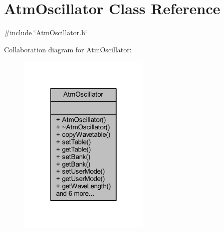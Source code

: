 \hypertarget{class_atm_oscillator}{}\section{Atm\+Oscillator Class Reference}
\label{class_atm_oscillator}


{\ttfamily \#include \char`\"{}Atm\+Oscillator.\+h\char`\"{}}



Collaboration diagram for Atm\+Oscillator\+:
\nopagebreak
\begin{figure}[H]
\begin{center}
\leavevmode
\includegraphics[width=178pt]{da/daa/class_atm_oscillator__coll__graph}
\end{center}
\end{figure}
